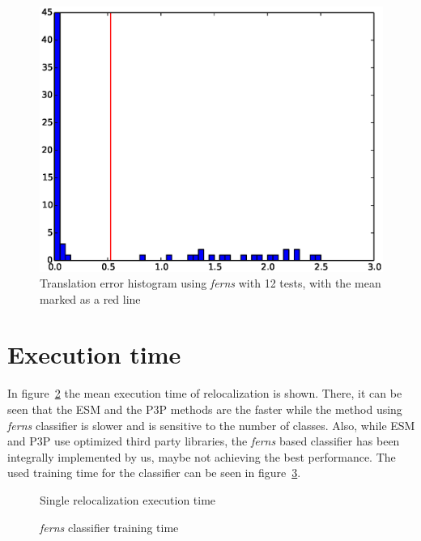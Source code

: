 \begin{figure}[htpb]
          \includegraphics[width=1\linewidth]{img/large_desktop/ferns_100_dist.eps}
          \caption{Translation error histogram using \textit{ferns} with 12 tests, with the mean marked as a red line}                
          \label{fig:large_desktop_ferns_dist}
\end{figure}

\section{Execution time}
\label{sec:execution_time}

In figure~\ref{fig:exec_time} the mean execution time of relocalization is shown. There, it can be seen that the ESM and the P3P methods are the faster while the method using \textit{ferns} classifier is slower and is sensitive to the number of classes. Also, while ESM and P3P use optimized third party libraries, the \textit{ferns} based classifier has been integrally implemented by us, maybe not achieving the best performance. The used training time for the classifier can be seen in figure~\ref{fig:training_time}.\\

\begin{figure}[htpb]
  \centering
  \begin{bchart}[steps={0.2,0.4,0.6,0.8,1},max=1, scale=0.6]
  \end{bchart}
  \caption{Single relocalization execution time}
  \label{fig:exec_time}
\end{figure}


\begin{figure}[htpb]
  \centering
  \begin{bchart}[step=10, max=70, scale=0.6]
  \end{bchart}
  \caption{\textit{ferns} classifier training time}
  \label{fig:training_time}
\end{figure}
